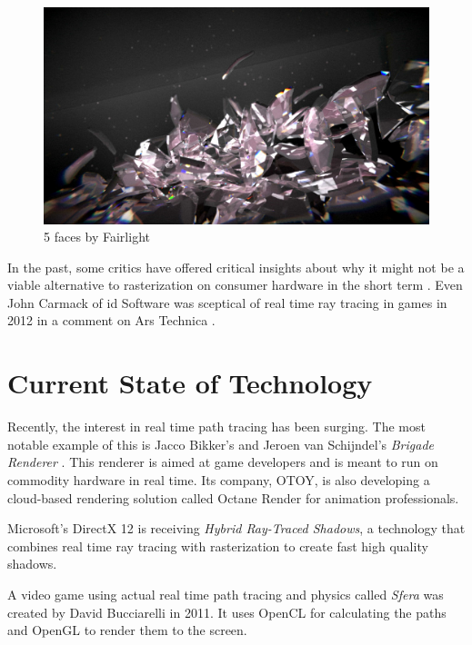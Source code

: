 \documentclass[
  twoside,
  11pt, a4paper,
  footinclude=true,
  headinclude=true,
  cleardoublepage=empty
]{scrreprt}
\begin{document}
\begin{figure}[H]
    \includegraphics[scale=0.5]{5faces}
    \centering
    \caption{5 faces by Fairlight}
    \label{fig:5faces}
\end{figure}

In the past, some critics have offered critical insights about why it might not be a viable
alternative to rasterization on consumer hardware in the short term
\cite{site:raytracing-vs-rasterization} \cite{site:codinghorror-raytracing}. Even John Carmack of
id Software was sceptical of real time ray tracing in games in 2012 in a comment on Ars Technica
\cite{site:carmack-scepticism}.

\section{Current State of Technology}
Recently, the interest in real time path tracing has been surging. The most notable
example of this is Jacco Bikker's and Jeroen van Schijndel's \emph{Brigade Renderer} \cite{article:brigade}
\cite{site:brigade}. This renderer is aimed at game developers and is meant to run on commodity
hardware in real time. Its company, OTOY, is also developing a cloud-based rendering solution
called Octane Render \cite{site:octane} for animation professionals.

Microsoft's DirectX 12 \cite{site:dx12-raytracing} is receiving \emph{Hybrid Ray-Traced Shadows}, a
technology that combines real time ray tracing with rasterization to create fast high quality
shadows.

A video game using actual real time path tracing and physics called \emph{Sfera} was created by
David Bucciarelli \cite{site:sfera} in 2011. It uses OpenCL for calculating the paths and OpenGL to
render them to the screen.
\end{document}
